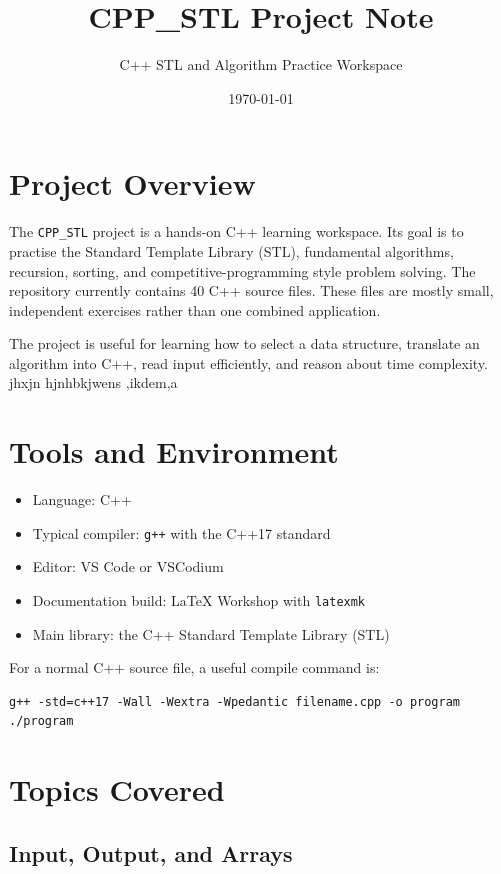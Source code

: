 \documentclass[12pt,a4paper]{article}
\title{CPP\_STL Project Note}
\author{C++ STL and Algorithm Practice Workspace}
\date{\today}
\begin{document}
\maketitle
\tableofcontents
\newpage

\section{Project Overview}

The \texttt{CPP\_STL} project is a hands-on C++ learning workspace. Its goal is
to practise the Standard Template Library (STL), fundamental algorithms,
recursion, sorting, and competitive-programming style problem solving. The
repository currently contains 40 C++ source files. These files are mostly small,
independent exercises rather than one combined application.

The project is useful for learning how to select a data structure, translate an
algorithm into C++, read input efficiently, and reason about time complexity. jhxjn hjnhbkjwens ,ikdem,a 

\section{Tools and Environment}

\begin{itemize}
    \item Language: C++
    \item Typical compiler: \texttt{g++} with the C++17 standard
    \item Editor: VS Code or VSCodium
    \item Documentation build: LaTeX Workshop with \texttt{latexmk}
    \item Main library: the C++ Standard Template Library (STL)
\end{itemize}

For a normal C++ source file, a useful compile command is:

\begin{verbatim}
g++ -std=c++17 -Wall -Wextra -Wpedantic filename.cpp -o program
./program
\end{verbatim}

\section{Topics Covered}

\subsection{Input, Output, and Arrays}
\end{document}
